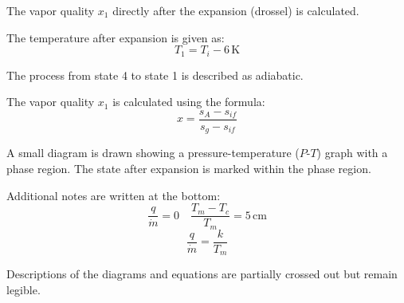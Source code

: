 The vapor quality \(x_1\) directly after the expansion (drossel) is calculated.  

The temperature after expansion is given as:  
\[
T_1 = T_i - 6 \, \text{K}
\]  

The process from state 4 to state 1 is described as adiabatic.  

The vapor quality \(x_1\) is calculated using the formula:  
\[
x = \frac{s_A - s_{if}}{s_g - s_{if}}
\]  

A small diagram is drawn showing a pressure-temperature (\(P\)-\(T\)) graph with a phase region. The state after expansion is marked within the phase region.  

Additional notes are written at the bottom:  
\[
\frac{q}{\dot{m}} = 0 \quad \frac{T_m - T_c}{T_m} = 5 \, \text{cm}
\]  
\[
\frac{q}{\dot{m}} = \frac{k}{T_m}
\]  

Descriptions of the diagrams and equations are partially crossed out but remain legible.